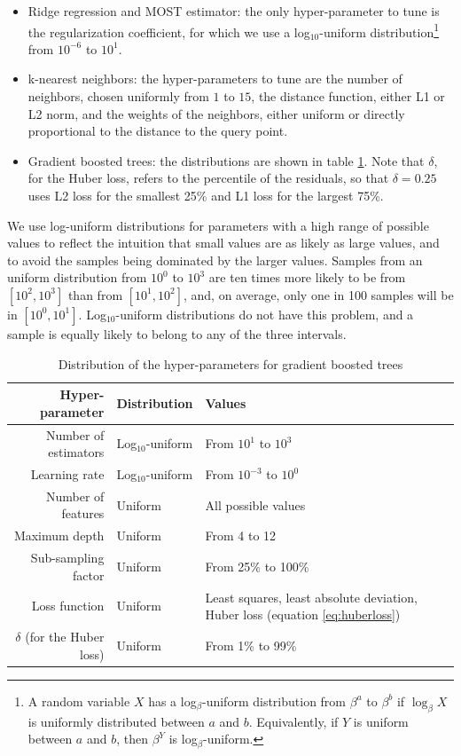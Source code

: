 \documentclass[a4paper,11pt]{kth-mag}
\begin{document}
\begin{itemize}
\item Ridge regression and MOST estimator: the only hyper-parameter to tune is the regularization coefficient, for which we use a log$_{10}$-uniform distribution\footnote{A random variable $X$ has a log$_\beta$-uniform distribution from $\beta^a$ to $\beta^b$ if $\log_\beta X$ is uniformly distributed between $a$ and $b$. Equivalently, if $Y$ is uniform between $a$ and $b$, then $\beta^Y$ is log$_\beta$-uniform.} from $10^{-6}$ to $10^{1}$.

\item k-nearest neighbors: the hyper-parameters to tune are the number of neighbors, chosen uniformly from $1$ to $15$, the distance function, either L1 or L2 norm, and the weights of the neighbors, either uniform or directly proportional to the distance to the query point.

\item Gradient boosted trees: the distributions are shown in table \ref{tbl:gb_hyperparams}. Note that $\delta$, for the Huber loss, refers to the percentile of the residuals, so that $\delta=0.25$ uses L2 loss for the smallest 25\% and L1 loss for the largest 75\%.
\end{itemize}

We use log-uniform distributions for parameters with a high range of possible values to reflect the intuition that small values are as likely as large values, and to avoid the samples being dominated by the larger values. Samples from an uniform distribution from $10^0$ to $10^3$ are ten times more likely to be from $[10^2,10^3]$ than from $[10^1,10^2]$, and, on average, only one in 100 samples will be in $[10^0,10^1]$. Log$_{10}$-uniform distributions do not have this problem, and a sample is equally likely to belong to any of the three intervals.

\begin{table}[]
\centering
\caption{Distribution of the hyper-parameters for gradient boosted trees}
\label{tbl:gb_hyperparams}
\begin{tabularx}{\textwidth}{r|l|X}
\toprule
\textbf{Hyper-parameter} & \textbf{Distribution} & \textbf{Values} \\ \midrule
Number of estimators & Log$_{10}$-uniform & From $10^1$ to $10^3$ \\
Learning rate & Log$_{10}$-uniform & From $10^{-3}$ to $10^0$ \\
Number of features & Uniform & All possible values \\
Maximum depth & Uniform & From 4 to 12 \\
Sub-sampling factor & Uniform & From 25\% to 100\% \\
Loss function & Uniform & Least squares, least absolute deviation, \newline Huber loss (equation \ref{eq:huberloss}) \\
$\delta$ (for the Huber loss) & Uniform & From 1\% to 99\% \\
\bottomrule
\end{tabularx}
\end{table}
\end{document}
